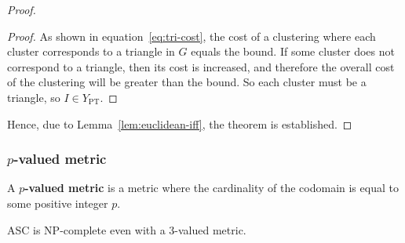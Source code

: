 \begin{proof}
\begin{proof}
    As shown in equation~\eqref{eq:tri-cost}, the cost of a clustering where
    each cluster corresponds to a triangle in $G$ equals the bound.  If some
    cluster does not correspond to a triangle, then its cost is increased, and
    therefore the overall cost of the clustering will be greater than the
    bound.  So each cluster must be a triangle, so $I \in Y_{\text{PT}}$.
  \end{proof}
  Hence, due to Lemma~\ref{lem:euclidean-iff}, the theorem is established.
\end{proof}

\subsubsection{$p$-valued metric}
\label{sec:p-valued-metric}

\begin{dfn}
  A \textbf{$p$-valued metric} is a metric where the cardinality of the
  codomain is equal to some positive integer $p$.
\end{dfn}

\begin{thm}
  \label{thm:np-complete-3-val}
  ASC is NP-complete even with a 3-valued metric.
\end{thm}

